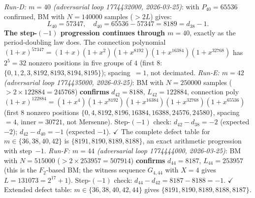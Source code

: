 \documentclass[11pt]{article}
\theoremstyle{plain}
\theoremstyle{definition}
\begin{document}
\emph{Run-D: $m=40$ (adversarial loop 1774432000, 2026-03-25)}: with $P_{40}=65536$
confirmed, BM with $N=140000$ samples ($> 2L$) gives:
\[
  L_{40} = 57347,\quad d_{40} = 65536-57347 = 8189 = d_{38}-1.
\]
\textbf{The step-$(-1)$ progression continues through $m=40$}, exactly as the period-doubling
law does.  The connection polynomial
$(1+x)^{57347} = (1+x)(1+x^2)(1+x^{8192})(1+x^{16384})(1+x^{32768})$
has $2^5=32$ nonzero positions in five groups of $4$ (first 8: $\{0,1,2,3,8192,8193,8194,8195\}$);
spacing~$=1$, not decimated.
\emph{Run-E: $m=42$ (adversarial loop 1774435000, 2026-03-25)}: BM with $N=250000$
samples ($> 2\times 122884 = 245768$) \textbf{confirms} $d_{42}=8188$, $L_{42}=122884$,
connection poly $(1+x)^{122884}=(1+x^4)(1+x^{8192})(1+x^{16384})(1+x^{32768})(1+x^{65536})$
(first 8 nonzero positions $\{0,4,8192,8196,16384,16388,24576,24580\}$, spacing$=4$, inner$=30721$,
not Mersenne).
Step-$(-1)$ check: $d_{42}-d_{38}=-2$ (expected $-2$); $d_{42}-d_{40}=-1$ (expected $-1$). $\checkmark$
The complete defect table for $m\in\{36,38,40,42\}$ is $\{8191,8190,8189,8188\}$,
an exact arithmetic progression with step~$-1$.
\emph{Run-F: $m=44$ (adversarial loop 1774444000, 2026-03-25)}: BM with $N=515000$
($> 2\times 253957 = 507914$) \textbf{confirms} $d_{44}=8187$, $L_{44}=253957$
(this is the $F_2$-based BM; the witness sequence $G_{4,44}$ with $X=4$ gives $L=131073=2^{17}+1$).
Step-$(-1)$ check: $d_{44}-d_{42}=8187-8188=-1$. $\checkmark$
Extended defect table: $m\in\{36,38,40,42,44\}$ gives $\{8191,8190,8189,8188,8187\}$.
\end{document}
